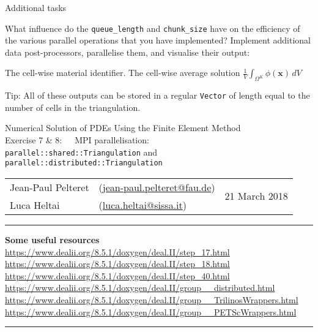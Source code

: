 \documentclass[11pt]{exam}
\makeatletter
\newcommand{\makeheader}[3]{%
\setcounter{question}{0}
\begin{center}
{\sc Numerical Solution of PDEs Using the Finite Element Method}\vspace{2ex}\\
{\sc Exercise #1:\ \ \ #2}\vspace{2ex}\\
\begin{tabular*}{\textwidth}{ll @{\extracolsep{\fill}}r}
Jean-Paul Pelteret & (\url{jean-paul.pelteret@fau.de}) & \multirow{2}{*}{#3} \\
Luca Heltai & (\url{luca.heltai@sissa.it}) & \\
\end{tabular*}
\end{center}
}
\newcommand{\makeresources}[1]{%
\rule{\textwidth}{0.6mm}
\textbf{Some useful resources}\\[1.5ex]
#1 \par
\rule{\textwidth}{0.6mm}
}
\makeatother
\begin{document}
\begin{questions}
\question Additional tasks
\begin{parts}
\bonuspart What influence do the \verb|queue_length| and \verb|chunk_size| have on the efficiency of the various parallel operations that you have implemented?
\bonuspart Implement additional data post-processors, parallelise them, and visualise their output:
\begin{subparts}
\subpart The cell-wise material identifier.
\subpart The cell-wise average solution $\frac{1}{V}\int_{\Omega^{K}} \phi \left(\mathbf{x}\right) \, dV$
\end{subparts}
Tip: All of these outputs can be stored in a regular \verb|Vector| of length equal to the number of cells in the triangulation.
\end{parts}

\end{questions}




\clearpage
\makeheader{7 \& 8}{MPI parallelisation: \\\texttt{parallel::shared::Triangulation} and \texttt{parallel::distributed::Triangulation}}{21 March 2018}
\makeresources{%
\url{https://www.dealii.org/8.5.1/doxygen/deal.II/step_17.html} \\
\url{https://www.dealii.org/8.5.1/doxygen/deal.II/step_18.html} \\
\url{https://www.dealii.org/8.5.1/doxygen/deal.II/step_40.html} \\
\url{https://www.dealii.org/8.5.1/doxygen/deal.II/group__distributed.html} \\
\url{https://www.dealii.org/8.5.1/doxygen/deal.II/group__TrilinosWrappers.html} \\
\url{https://www.dealii.org/8.5.1/doxygen/deal.II/group__PETScWrappers.html}
}




\end{document}
